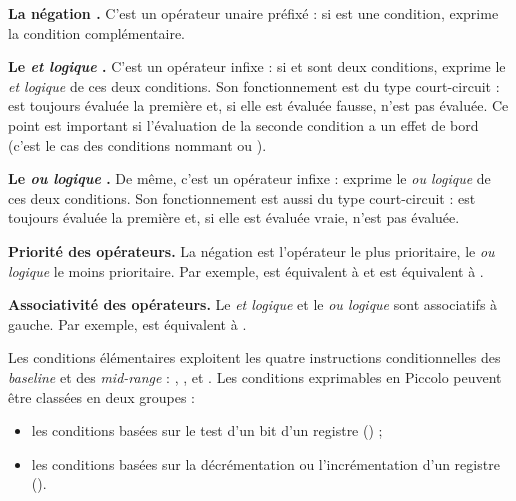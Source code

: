 \textbf{La négation \piccolo{\!}.} C'est un opérateur unaire préfixé : si  est une condition,  exprime la condition complémentaire. %


\textbf{Le \emph{et logique} \piccolo{\&}.} C'est un opérateur infixe : si  et  sont deux conditions,  exprime le \emph{et logique} de ces deux conditions. Son fonctionnement est du type court-circuit :  est toujours évaluée la première et, si elle est évaluée fausse,  n'est pas évaluée. Ce point est important si l'évaluation de la seconde condition a un effet de bord (c'est le cas des conditions nommant  ou ).

\textbf{Le \emph{ou logique} \piccolo{|}.} De même, c'est un opérateur infixe :  exprime le \emph{ou logique} de ces deux conditions. Son fonctionnement est aussi du type court-circuit :  est toujours évaluée la première et, si elle est évaluée vraie,  n'est pas évaluée.

\textbf{Priorité des opérateurs.} La négation \piccolo{\!} est l'opérateur le plus prioritaire, le \emph{ou logique} \piccolo{|} le moins prioritaire. Par exemple,  est équivalent à  et  est équivalent à .

\textbf{Associativité des opérateurs.} Le \emph{et logique} \piccolo{\&} et le \emph{ou logique} \piccolo{|} sont associatifs à gauche. Par exemple,  est équivalent à .



Les conditions élémentaires exploitent les quatre instructions conditionnelles des \emph{baseline} et des \emph{mid-range} : , ,  et . Les conditions exprimables en Piccolo peuvent être classées en deux groupes :
\begin{itemize}
  \item les conditions basées sur le test d'un bit d'un registre () ;
  \item les conditions basées sur la décrémentation ou l'incrémentation d'un registre ().
\end{itemize}


